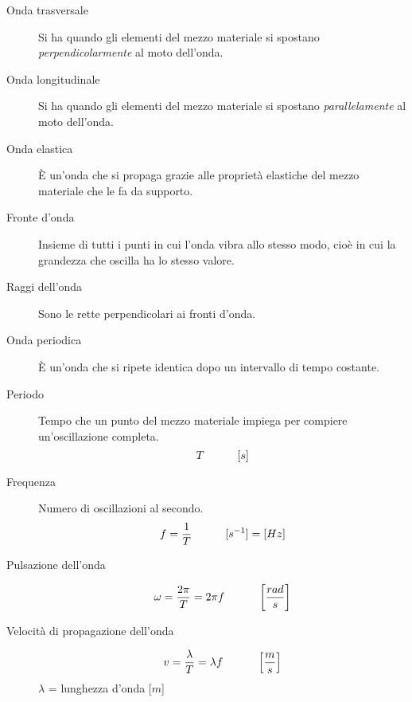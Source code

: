 \documentclass[a4paper,11pt,italian]{article}
\begin{document}
\begin{description}
  \item[Onda trasversale] 
  Si ha quando gli elementi del mezzo materiale si spostano \emph{perpendicolarmente} al moto dell'onda.
  
  \item[Onda longitudinale] 
  Si ha quando gli elementi del mezzo materiale si spostano \emph{parallelamente} al moto dell'onda.
  
  \item[Onda elastica] 
  È un'onda che si propaga grazie alle proprietà elastiche del mezzo materiale che le fa da supporto.
  
  \item[Fronte d'onda] 
  Insieme di tutti i punti in cui l'onda vibra allo stesso modo, cioè in cui la grandezza che oscilla ha lo stesso valore.
  
  \item[Raggi dell'onda] 
  Sono le rette perpendicolari ai fronti d'onda.
  
  \item[Onda periodica] 
  È un'onda che si ripete identica dopo un intervallo di tempo costante.
  
  \item[Periodo] 
  Tempo che un punto del mezzo materiale impiega per compiere un'oscillazione completa.
  \[ T \hspace*{3em} [s] \]
  
  \item[Frequenza] 
  Numero di oscillazioni al secondo.
  \[ f = \frac{1}{T} \hspace*{3em} [s^{-1}]=[ Hz] \]
  
  \item[Pulsazione dell'onda]
  \[ \omega = \frac{2\pi}{T} = 2\pi f \hspace*{3em} \left[ \frac{rad}{s} \right] \]
  
  \item[Velocità di propagazione dell'onda] 
  \[ v = \frac{\lambda}{T} = \lambda f \hspace*{3em} \left[ \frac{m}{s} \right] \]
  $ \lambda $ = lunghezza d'onda [$ m $]

\end{description}
\end{document}
